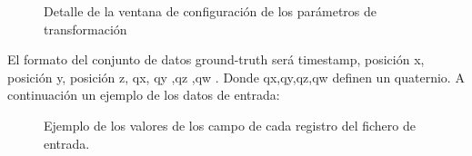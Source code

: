 \begin{figure}[H]
\begin{center}
\hspace{0.5cm}
\end{center}
\caption{Detalle de la ventana de configuración de los parámetros de transformación }
\end{figure}


El formato del conjunto de datos ground-truth será timestamp, posición x, posición y, posición z, qx, qy ,qz ,qw . Donde qx,qy,qz,qw definen un quaternio.
A continuación un ejemplo de los datos de entrada:
\begin{figure}[H]
\begin{center}
\hspace{0.5cm}
\end{center}
\caption{Ejemplo de los valores de los campo de cada registro del fichero de entrada. }
\end{figure}


